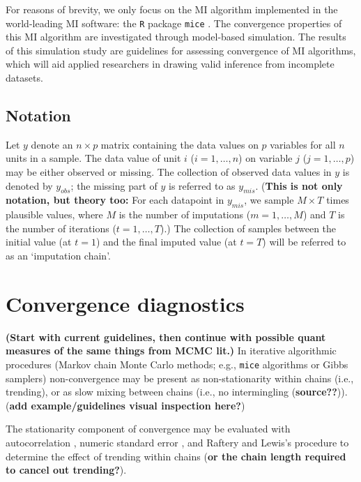 \documentclass[Royal,times,sageh]{sagej}
\begin{document}
For reasons of brevity, we only focus on the MI algorithm implemented in
the world-leading MI software: the \texttt{R} \citep{R} package
\texttt{mice} \citep{mice}. The convergence properties of this MI
algorithm are investigated through model-based simulation. The results
of this simulation study are guidelines for assessing convergence of MI
algorithms, which will aid applied researchers in drawing valid
inference from incomplete datasets.

\hypertarget{notation}{%
\subsection{Notation}\label{notation}}

Let \(y\) denote an \(n \times p\) matrix containing the data values on
\(p\) variables for all \(n\) units in a sample. The data value of unit
\(i\) (\(i = 1, \dots, n\)) on variable \(j\) (\(j = 1, \dots, p\)) may
be either observed or missing. The collection of observed data values in
\(y\) is denoted by \(y_{obs}\); the missing part of \(y\) is referred
to as \(y_{mis}\). (\textbf{This is not only notation, but theory too:}
For each datapoint in \(y_{mis}\), we sample \(M \times T\) times
plausible values, where \(M\) is the number of imputations
(\(m = 1, \dots, M\)) and \(T\) is the number of iterations
(\(t = 1, \dots, T\)).) The collection of samples between the initial
value (at \(t=1\)) and the final imputed value (at \(t=T\)) will be
referred to as an `imputation chain'.

\hypertarget{convergence-diagnostics}{%
\section{Convergence diagnostics}\label{convergence-diagnostics}}

\textbf{(Start with current guidelines, then continue with possible
quant measures of the same things from MCMC lit.)} In iterative
algorithmic procedures (Markov chain Monte Carlo methods; e.g.,
\texttt{mice} algorithms or Gibbs samplers) non-convergence may be
present as non-stationarity within chains (i.e., trending), or as slow
mixing between chains (i.e., no intermingling (\textbf{source??})).
(\textbf{add example/guidelines visual inspection here?})

The stationarity component of convergence may be evaluated with
autocorrelation \citep[\(AC\);][]{scha97, gelm13}, numeric standard
error \citep[or `MC error';][]{gewe92}, and Raftery and Lewis's
\citeyearpar{raft91} procedure to determine the effect of trending
within chains (\textbf{or the chain length required to cancel out
trending?}).
\end{document}
